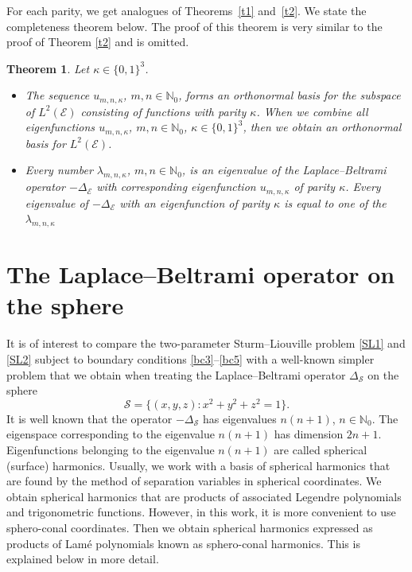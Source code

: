 \documentclass[pdftex]{sigma}
\newtheorem{thm}{Theorem}[section]
\newcommand{\N}{\mathbb{N}}
\newcommand{\E}{\mathcal{E}}
\newcommand{\Sp}{\mathcal{S}}
\newcommand{\D}{\Delta_\E}
\numberwithin{equation}{section}
\begin{document}
For each parity, we get analogues of Theorems~\ref{t1} and~\ref{t2}.
We state the completeness theorem below. The proof of this theorem is very similar to the proof of Theorem \ref{t2} and is omitted.

\begin{thm}%
Let $\kappa\in \{0,1\}^3$.
\begin{itemize}\itemsep=0pt
\item[$(i)$]
The sequence $u_{m,n,\kappa}$, $m,n\in\N_0$,
forms an orthonormal basis for the subspace of $L^2(\E)$ consisting of functions with parity $\kappa$.
When we combine all eigenfunctions $u_{m,n,\kappa}$, ${m,n\in\N_0}$, $\kappa\in\{0,1\}^3$, then we obtain an orthonormal basis for
$L^2(\E)$.

\item[$(ii)$]
Every number $\lambda_{m,n,\kappa}$, $m,n\in\N_0$, is an eigenvalue of the Laplace--Beltrami operator $-\D$
with corresponding eigenfunction $u_{m,n,\kappa}$ of parity $\kappa$.
Every eigenvalue of $-\D$ with an eigenfunction of parity $\kappa$ is equal to one of the $\lambda_{m,n,\kappa}$
\end{itemize}
\end{thm}

\section{The Laplace--Beltrami operator on the sphere}\label{sphere}

It is of interest to compare
the two-parameter Sturm--Liouville problem \eqref{SL1} and \eqref{SL2}
subject to boundary conditions \eqref{bc3}--\eqref{bc5} with a well-known simpler problem
that we obtain when treating the Laplace--Beltrami operator $\Delta_\Sp$ on the sphere
\[ \Sp=\{(x,y,z)\colon x^2+y^2+z^2=1\}.\]
It is well known that the operator $-\Delta_\Sp$ has eigenvalues $n(n+1)$, $n\in\N_0$. The eigenspace corresponding to
the eigenvalue $n(n+1)$ has dimension $2n+1$. Eigenfunctions belonging to the eigenvalue $n(n+1)$ are called spherical (surface) harmonics.
Usually, we work with a basis of spherical harmonics that are found by the method of separation variables in spherical coordinates.
We obtain spherical harmonics that are products of associated Legendre polynomials and trigonometric functions.
However, in this work, it is more convenient to
use sphero-conal coordinates. Then we obtain spherical harmonics expressed as products of Lam\'e polynomials known as sphero-conal harmonics.
This is explained below in more detail.
\end{document}
